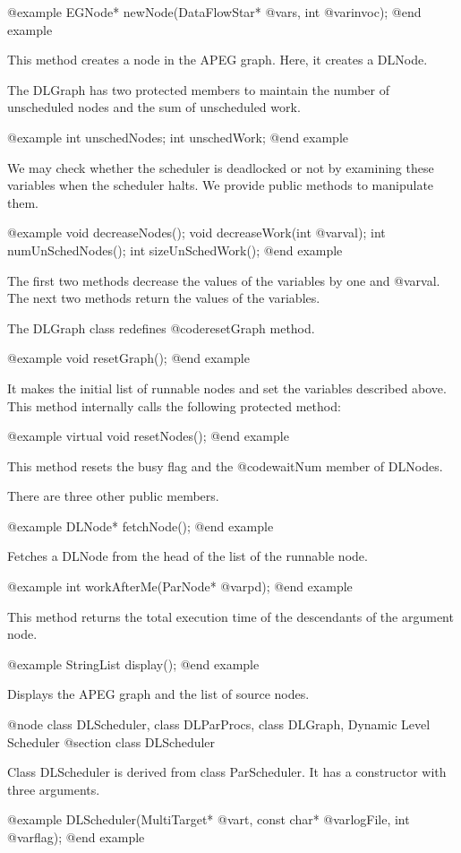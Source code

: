 @example
EGNode* newNode(DataFlowStar* @var{s}, int @var{invoc});
@end example

This method creates a node in the APEG graph. Here, it creates a DLNode.

The DLGraph has two protected members to maintain the number of
unscheduled nodes and the sum of unscheduled work.

@example
int unschedNodes;
int unschedWork;
@end example

We may check whether the scheduler is deadlocked or not by examining these
variables when the scheduler halts. We provide public methods to
manipulate them.

@example
void decreaseNodes();
void decreaseWork(int @var{val});
int numUnSchedNodes();
int sizeUnSchedWork();
@end example

The first two methods decrease the values of the variables by one and
@var{val}. The next two methods return the values of the variables.

The DLGraph class redefines @code{resetGraph} method.

@example
void resetGraph();
@end example

It makes the initial list of runnable nodes and set the variables described
above. This method internally calls the following protected method:

@example
virtual void resetNodes();
@end example

This method resets the busy flag and the @code{waitNum}
member of DLNodes.

There are three other public members.

@example
DLNode* fetchNode();
@end example

Fetches a DLNode from the head of the list of the runnable node.

@example
int workAfterMe(ParNode* @var{pd});
@end example

This method returns the total execution time of the descendants of
the argument node. 

@example
StringList display();
@end example

Displays the APEG graph and the list of source nodes.

@node class DLScheduler, class DLParProcs, class DLGraph, Dynamic Level Scheduler
@section class DLScheduler

Class DLScheduler is derived from class ParScheduler. It has a constructor
with three arguments.

@example
DLScheduler(MultiTarget* @var{t}, const char* @var{logFile}, int @var{flag});
@end example

